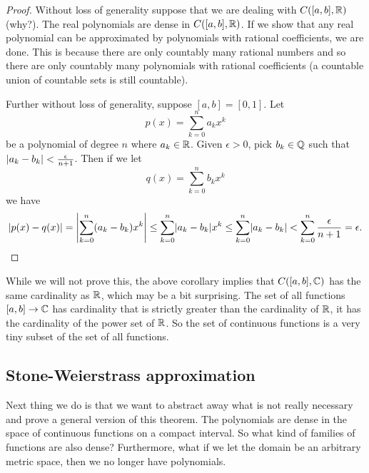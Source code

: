 \begin{proof}
Without loss of generality suppose that we are dealing with $C([a,b],{\mathbb{R}})$
(why?).
The real polynomials are dense in $C([a,b],{\mathbb{R}})$.  If we show that
any real polynomial can be approximated by polynomials with rational
coefficients, we are done.  This is because there are only countably many
rational numbers and so there are only countably many polynomials with
rational coefficients (a countable union of countable sets is still
countable).

Further without loss of generality, suppose $[a,b]=[0,1]$.  Let
\begin{equation*}
p(x) = \sum_{k=0}^n a_k x^k
\end{equation*}
be a polynomial of degree $n$ where $a_k \in {\mathbb{R}}$.  Given $\epsilon > 0$, pick $b_k \in {\mathbb{Q}}$
such that $\lvert {a_k-b_k} \rvert < \frac{\epsilon}{n+1}$.  Then
if we let
\begin{equation*}
q(x) = \sum_{k=0}^n b_k x^k
\end{equation*}
we have
\begin{equation*}
\lvert {p(x)-q(x)} \rvert
=
\left\lvert {\sum_{k=0}^n (a_k-b_k) x^k} \right\rvert
\leq
\sum_{k=0}^n \lvert {a_k-b_k} \rvert x^k
\leq
\sum_{k=0}^n \lvert {a_k-b_k} \rvert
<
\sum_{k=0}^n \frac{\epsilon}{n+1} = \epsilon . \qedhere
\end{equation*}
\end{proof}

\begin{remark}
While we will not prove this, the above corollary implies that
$C([a,b],{\mathbb{C}})$ has the same cardinality as ${\mathbb{R}}$, which may be a
bit surprising.  The set of all functions $[a,b] \to {\mathbb{C}}$ has
cardinality that is strictly greater than the cardinality of ${\mathbb{R}}$, it has the
cardinality of the power set of ${\mathbb{R}}$.  So the
set of continuous functions is a very tiny subset of the set of all
functions.
\end{remark}

\subsection{Stone-Weierstrass approximation}

Next thing we do is that we want to abstract away what is not really
necessary and prove a general version of this theorem.
The polynomials are dense in the space of continuous
functions on a compact interval.  So what kind of families of
functions are also dense?  Furthermore, what if we let the domain be an
arbitrary metric space, then we no longer have polynomials.

